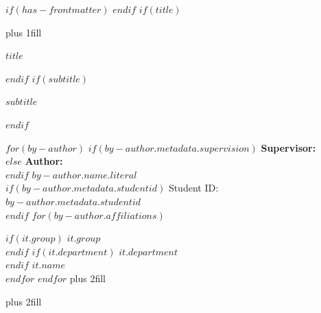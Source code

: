 $if(has-frontmatter)$
\frontmatter
$endif$
$if(title)$
\cleardoublepage
\thispagestyle{empty}
{\centering
\hbox{}\vskip 0cm plus 1fill

{%
\Huge\bfseries $title$ \par}
$endif$
$if(subtitle)$
\vspace{3ex}
{\Large\bfseries $subtitle$ \par}
$endif$
\vspace{5ex}

$for(by-author)$
    $if(by-author.metadata.supervision)$
    {\bfseries Supervisor: \\ \vspace{0.5ex}}
    $else$
    {\bfseries Author: \\ \vspace{0.5ex}}
    $endif$
    {\bfseries\Large $by-author.name.literal$ \\ \vspace{0.7ex}}
    $if(by-author.metadata.studentid)$
        {\large Student ID: $by-author.metadata.studentid$ \\ \vspace{1.2ex} }
    $endif$
    $for(by-author.affiliations)$%
        \par \vspace{0.7ex}
        $if(it.group)$%
        {\large $it.group$ \\ \vspace{0.7ex}}
        $endif$%
        $if(it.department)$%
        {\large $it.department$ \\ \vspace{0.7ex}}
        $endif$%
        {\large $it.name$ \\ \vspace{2ex}}
    $endfor$%
$endfor$%
\vskip 0cm plus 2fill

{ \par}
\vskip 0cm plus 2fill

}
